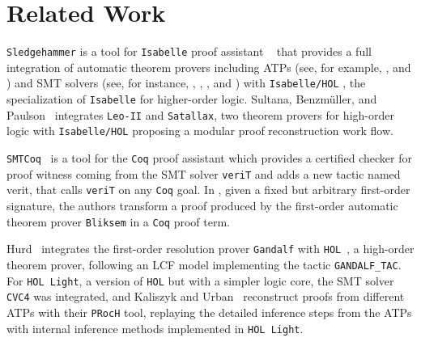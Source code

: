 \documentclass[main.tex]{subfiles}
\begin{document}

\section{Related Work}
\label{sec:related-work}

\verb!Sledgehammer! is a tool for \verb!Isabelle! proof assistant
~\cite{paulson1994isabelle} that provides a full integration of automatic
theorem provers including ATPs
(see, for example, \cite{meng2006automation}, \cite{blanchette2013extending}
and \cite{Fleury2014}) and SMT solvers (see, for instance,
\cite{hurlin07practical}, \cite{bohme2010},
\cite{blanchette2013extending}, and \cite{Fleury2014}) with
\verb!Isabelle/HOL! \cite{nipkow2002isabelle}, the specialization of
\verb!Isabelle! for higher-order logic. Sultana, Benzm{\"{u}}ller, and
Paulson~\cite{Een2004} integrates \verb!Leo-II! and \verb!Satallax!, two
theorem provers for high-order logic with \verb!Isabelle/HOL! proposing a
modular proof reconstruction work flow.

\verb!SMTCoq!~\cite{armand2011,Ekici2017} is a tool for the \verb!Coq!
proof assistant \cite{coqteam} which provides a certified checker for
proof witness coming from the SMT solver \verb!veriT! \cite{bouton2009}
and adds a new tactic named verit, that calls \verb!veriT! on any
\verb!Coq! goal. In \cite{bezem2002automated}, given a fixed but arbitrary
first-order signature, the authors transform a proof produced by the
first-order automatic theorem prover \verb!Bliksem! \cite{deNivelle2003}
in a \verb!Coq! proof term.

Hurd~\cite{Hurd1999} integrates the first-order resolution prover
\verb!Gandalf! with \verb!HOL!~\cite{norrish2007hol}, a high-order theorem
prover, following an LCF model implementing the tactic \verb!GANDALF_TAC!.
For \verb!HOL Light!, a version of \verb!HOL! but with a simpler logic core,
the SMT solver \verb!CVC4! was integrated, and Kaliszyk and
Urban~\cite{kaliszyk2013} reconstruct proofs from different ATPs with their
\verb!PRocH! tool, replaying the detailed inference steps from the ATPs with
internal inference methods implemented in \verb!HOL Light!.



\end{document}
